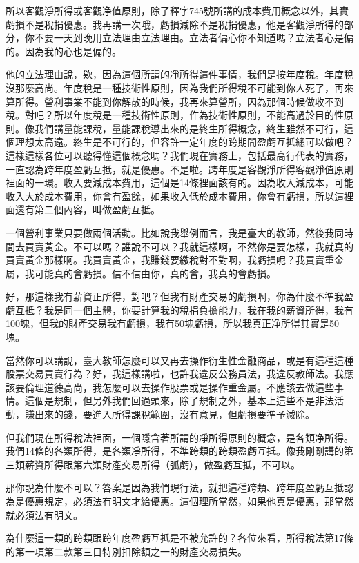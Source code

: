 \documentclass[]{ctexbook}
\begin{document}
所以客觀淨所得或客觀净值原則，除了釋字745號所講的成本費用概念以外，其實虧損不是稅捐優惠。我再講一次哦，虧損減除不是稅捐優惠，他是客觀淨所得的部分，你不要一天到晚用立法理由立法理由。立法者偏心你不知道嗎？立法者心是偏的。因為我的心也是偏的。

他的立法理由說，欸，因為這個所謂的凈所得這件事情，我們是按年度稅。年度稅沒那麼高尚。年度稅是一種技術性原則，因為我們所得稅不可能到你人死了，再來算所得。營利事業不能到你解散的時候，我再來算營所，因為那個時候做收不到稅。對吧？所以年度稅是一種技術性原則，作為技術性原則，不能高過於目的性原則。像我們講量能課稅，量能課稅導出來的是終生所得概念，終生雖然不可行，這個理想太高遠。終生是不可行的，但容許一定年度的跨期間盈虧互抵總可以做吧？這樣這樣各位可以聽得懂這個概念嗎？我們現在實務上，包括最高行代表的實務，一直認為跨年度盈虧互抵，就是優惠。不是啦。跨年度是客觀淨所得客觀淨值原則裡面的一環。收入要減成本費用，這個是14條裡面該有的。因為收入減成本，可能收入大於成本費用，你會有盈餘，如果收入低於成本費用，你會有虧損，所以這裡面還有第二個內容，叫做盈虧互抵。

一個營利事業只要做兩個活動。比如說我舉例而言，我是臺大的教師，然後我同時間去買賣黃金。不可以嗎？誰說不可以？我就這樣啊，不然你是要怎樣，我就真的買賣黃金那樣啊。我買賣黃金，我賺錢要繳稅對不對啊，我虧損呢？我買賣重金屬，我可能真的會虧損。信不信由你，真的會，我真的會虧損。

好，那這樣我有薪資正所得，對吧？但我有財產交易的虧損啊，你為什麼不準我盈虧互抵？我是同一個主體，你要計算我的稅捐負擔能力，我在我的薪資所得，我有100塊，但我的財產交易我有虧損，我有50塊虧損，所以我真正净所得其實是50塊。

當然你可以講說，臺大教師怎麼可以又再去操作衍生性金融商品，或是有這種這種股票交易買賣行為？好，我這樣講啦，也許我違反公務員法，我違反教師法。我應該要倫理道德高尚，我怎麼可以去操作股票或是操作重金屬。不應該去做這些事情。這個是規制，但另外我們回過頭來，除了規制之外，基本上這些不是非法活動，賺出來的錢，要進入所得課稅範圍，沒有意見，但虧損要準予減除。

但我們現在所得稅法裡面，一個隱含著所謂的凈所得原則的概念，是各類净所得。我們14條的各類所得，是各類凈所得，不準跨類的跨類盈虧互抵。像我剛剛講的第三類薪資所得跟第六類財產交易所得（弧虧），做盈虧互抵，不可以。

那你說為什麼不可以？答案是因為我們現行法，就把這種跨類、跨年度盈虧互抵認為是優惠規定，必須法有明文才給優惠。這個理所當然，如果他真是優惠，那當然就必須法有明文。

為什麼這一類的跨類跟跨年度盈虧互抵是不被允許的？各位來看，所得稅法第17條的第一項第二款第三目特別扣除額之一的財產交易損失。
\end{document}
